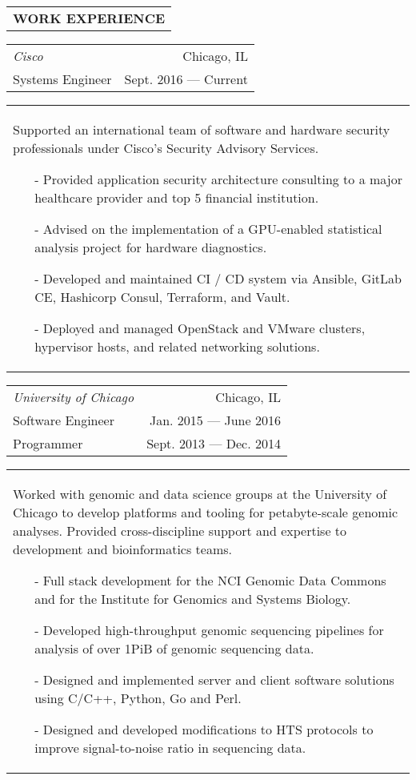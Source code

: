 \begin{tabularx}{\textwidth}{L}
    \textbf{WORK EXPERIENCE}
\end{tabularx}

\begin{tabularx}{\textwidth}{L R}
    \normalsize\textit{Cisco} & Chicago, IL \\
    Systems Engineer & Sept. 2016 --- Current \\
\end{tabularx}
\begin{tabularx}{\textwidth}{X}
    \vspace{1pt}
    Supported an international team of software and hardware security professionals under Cisco's Security Advisory Services.
    \begin{itemize}
        \itemsep{}
        \item[-] Provided application security architecture consulting to a major healthcare provider and top 5 financial institution.
        \item[-] Advised on the implementation of a GPU-enabled statistical analysis project for hardware diagnostics.
        \item[-] Developed and maintained CI / CD system via Ansible, GitLab CE, Hashicorp Consul, Terraform, and Vault.
        \item[-] Deployed and managed OpenStack and VMware clusters, hypervisor hosts, and related networking solutions.
    \end{itemize}
\end{tabularx}

\begin{tabularx}{\textwidth}{L R}
    \normalsize\textit{University of Chicago} & Chicago, IL \\
    Software Engineer & Jan. 2015 --- June 2016 \\
    Programmer & Sept. 2013 --- Dec. 2014 \\
\end{tabularx}
\begin{tabularx}{\textwidth}{X}
    \vspace{1pt}
    Worked with genomic and data science groups at the University of Chicago to develop platforms and tooling for petabyte-scale genomic analyses. Provided cross-discipline support and expertise to development and bioinformatics teams.
    \begin{itemize}
        \itemsep{}
        \item[-] Full stack development for the NCI Genomic Data Commons and for the Institute for Genomics and Systems Biology.
        \item[-] Developed high-throughput genomic sequencing pipelines for analysis of over 1PiB of genomic sequencing data.
        \item[-] Designed and implemented server and client software solutions using C/C++, Python, Go and Perl.
        \item[-] Designed and developed modifications to HTS protocols to improve signal-to-noise ratio in sequencing data.
    \end{itemize}
\end{tabularx}

